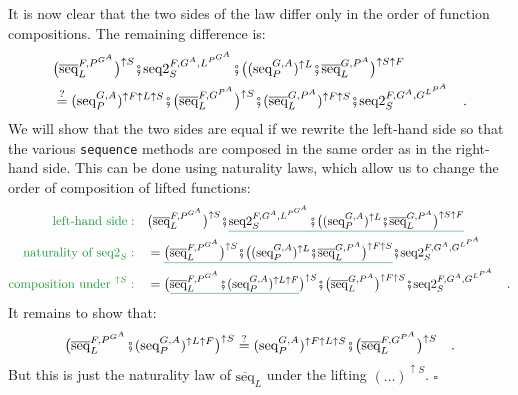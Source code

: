It is now clear that the two sides of the law differ only in the order
of function compositions. The remaining difference is:
\begin{align*}
 & \big(\overline{\text{seq}}_{L}^{F,P^{G^{A}}}\big)^{\uparrow S}\bef\text{seq2}_{S}^{F,G^{A},L^{P^{G^{A}}}}\bef\big((\text{seq}_{P}^{G,A})^{\uparrow L}\bef\overline{\text{seq}}_{L}^{G,P^{A}}\big)^{\uparrow S\uparrow F}\\
 & \overset{?}{=}(\text{seq}_{P}^{G,A})^{\uparrow F\uparrow L\uparrow S}\bef\big(\overline{\text{seq}}_{L}^{F,G^{P^{A}}}\big)^{\uparrow S}\bef(\overline{\text{seq}}_{L}^{G,P^{A}})^{\uparrow F\uparrow S}\bef\text{seq2}_{S}^{F,G^{A},G^{L^{P^{A}}}}\quad.
\end{align*}
We will show that the two sides are equal if we rewrite the left-hand
side so that the various \lstinline!sequence! methods are composed
in the same order as in the right-hand side. This can be done using
naturality laws, which allow us to change the order of composition
of lifted functions:
\begin{align*}
{\color{greenunder}\text{left-hand side}:}\quad & \big(\overline{\text{seq}}_{L}^{F,P^{G^{A}}}\big)^{\uparrow S}\bef\gunderline{\text{seq2}_{S}^{F,G^{A},L^{P^{G^{A}}}}\bef\big((\text{seq}_{P}^{G,A})^{\uparrow L}\bef\overline{\text{seq}}_{L}^{G,P^{A}}\big)^{\uparrow S\uparrow F}}\\
{\color{greenunder}\text{naturality of }\text{seq2}_{S}:}\quad & =\gunderline{\big(\overline{\text{seq}}_{L}^{F,P^{G^{A}}}\big)^{\uparrow S}\bef\big((\text{seq}_{P}^{G,A})^{\uparrow L}\bef\overline{\text{seq}}_{L}^{G,P^{A}}\big)^{\uparrow F\uparrow S}}\bef\text{seq2}_{S}^{F,G^{A},G^{L^{P^{A}}}}\\
{\color{greenunder}\text{composition under }^{\uparrow S}:}\quad & =\big(\gunderline{\overline{\text{seq}}_{L}^{F,P^{G^{A}}}\bef(\text{seq}_{P}^{G,A})^{\uparrow L\uparrow F}}\big)^{\uparrow S}\bef\big(\overline{\text{seq}}_{L}^{G,P^{A}}\big)^{\uparrow F\uparrow S}\bef\text{seq2}_{S}^{F,G^{A},G^{L^{P^{A}}}}\quad.
\end{align*}
It remains to show that: 
\[
\big(\overline{\text{seq}}_{L}^{F,P^{G^{A}}}\bef(\text{seq}_{P}^{G,A})^{\uparrow L\uparrow F}\big)^{\uparrow S}\overset{?}{=}(\text{seq}_{P}^{G,A})^{\uparrow F\uparrow L\uparrow S}\bef\big(\overline{\text{seq}}_{L}^{F,G^{P^{A}}}\big)^{\uparrow S}\quad.
\]
But this is just the naturality law of $\overline{\text{seq}}_{L}$
under the lifting $(\dots)^{\uparrow S}$. $\square$

